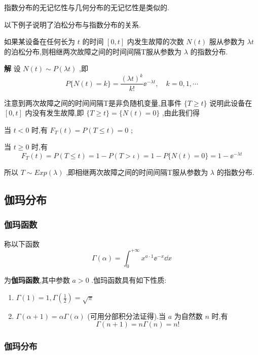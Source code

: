 指数分布的无记忆性与几何分布的无记忆性是类似的.

以下例子说明了泊松分布与指数分布的关系.

\begin{example}\label{exam:2.5.10}
	如果某设备在任何长为 $ t $ 的时间 $ [0,t] $ 内发生故障的次数 $ N(t) $ 服从参数为 $ \lambda t $ 的泊松分布,则相继两次故障之间的时间间隔T服从参数为 $ \lambda $ 的指数分布.
	
	\textbf{解} 设 $ N(t) \sim P(\lambda t) $ ,即
	\[
	P\{N(t)=k\}=\frac{(\lambda t)^{k}}{k !} \ee ^{-\lambda t}, \quad k=0,1, \cdots
	\]
	
	注意到两次故障之间的时间间隔T是非负随机变量,且事件 $ \{T \geqslant t\} $ 说明此设备在 $ [0,t] $ 内没有发生故障,即 $ \{T \geqslant t\}=\{N(t)=0\} $ ,由此我们得
	
	当 $ t<0 $ 时,有 $ F_{T}(t)=P(T \leqslant t)=0 $ ;
	
	当 $ t \geqslant 0 $ 时,有
	\[
	F_{T}(t)=P(T \leqslant t)=1-P(T>\iota)=1-P\{N(t)=0\}=1-\ee ^{-\lambda t}
	\]
	
	所以 $ T \sim E x p(\lambda) $ ,即相继两次故障之间的时间间隔T服从参数为 $ \lambda $ 的指数分布.
\end{example}

\subsection{伽玛分布}\label{ssec:2.5.4}

\subsubsection{伽玛函数}

称以下函数
\begin{equation}
\Gamma(\alpha)=\int_{0}^{+\infty} x^{a \cdot 1} \ee ^{-x} \dd x \label{eq:2.5.11}
\end{equation}

为\textbf{伽玛函数},其中参数 $ a>0 $ .伽玛函数具有如下性质:

\begin{enumerate}
	\item $ \Gamma(1)=1, \Gamma\left(\tfrac{1}{2}\right)=\sqrt{\pi} $ 
	\item $ \Gamma(\alpha+1)=\alpha \Gamma(\alpha) $ (可用分部积分法证得).当 $ a $ 为自然数 $ n $ 时,有
	\[
	\Gamma(n+1)=n \Gamma(n)=n !
	\]
\end{enumerate}

\subsubsection{伽玛分布}


